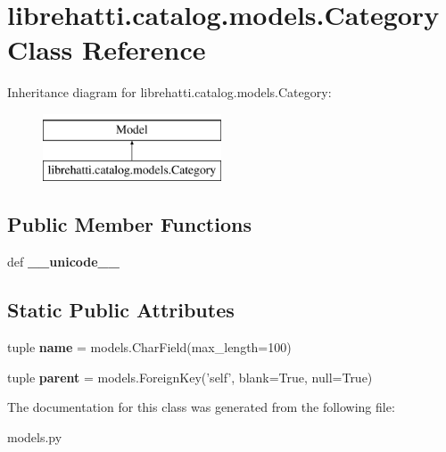 \hypertarget{classlibrehatti_1_1catalog_1_1models_1_1Category}{\section{librehatti.\-catalog.\-models.\-Category Class Reference}
\label{classlibrehatti_1_1catalog_1_1models_1_1Category}
}
Inheritance diagram for librehatti.\-catalog.\-models.\-Category\-:\begin{figure}[H]
\begin{center}
\leavevmode
\includegraphics[height=2.000000cm]{classlibrehatti_1_1catalog_1_1models_1_1Category}
\end{center}
\end{figure}
\subsection*{Public Member Functions}
\begin{DoxyCompactItemize}
\item 
\hypertarget{classlibrehatti_1_1catalog_1_1models_1_1Category_a5d88596aaab43cf627cb10fbcddd10e3}{def {\bfseries \-\_\-\-\_\-unicode\-\_\-\-\_\-}}\label{classlibrehatti_1_1catalog_1_1models_1_1Category_a5d88596aaab43cf627cb10fbcddd10e3}

\end{DoxyCompactItemize}
\subsection*{Static Public Attributes}
\begin{DoxyCompactItemize}
\item 
\hypertarget{classlibrehatti_1_1catalog_1_1models_1_1Category_aa4d0431c2037aeb6f7bcca4d110e3206}{tuple {\bfseries name} = models.\-Char\-Field(max\-\_\-length=100)}\label{classlibrehatti_1_1catalog_1_1models_1_1Category_aa4d0431c2037aeb6f7bcca4d110e3206}

\item 
\hypertarget{classlibrehatti_1_1catalog_1_1models_1_1Category_a68ae3d99ee7a2b5b505f76d827a5a87d}{tuple {\bfseries parent} = models.\-Foreign\-Key('self', blank=True, null=True)}\label{classlibrehatti_1_1catalog_1_1models_1_1Category_a68ae3d99ee7a2b5b505f76d827a5a87d}

\end{DoxyCompactItemize}


The documentation for this class was generated from the following file\-:\begin{DoxyCompactItemize}
\item 
models.\-py\end{DoxyCompactItemize}
